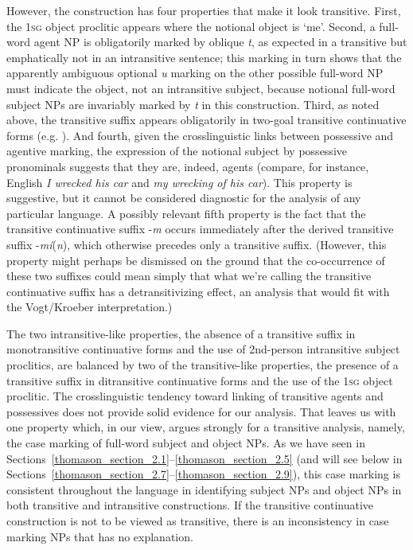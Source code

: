 \documentclass[output=paper,colorlinks,citecolor=brown]{langscibook}
\begin{document}
However, the construction has four properties that make it look
transitive.  First, the \textsc{1sg} object proclitic appears where the
notional object is `me'.  Second, a full-word agent NP is obligatorily
marked by oblique \emph{t}, as expected in a transitive but
emphatically not in an intransitive sentence; this marking in turn
shows that the apparently ambiguous optional \emph{{\textltilde}u}
marking on the other possible full-word NP must indicate the object,
not an intransitive subject, because notional full-word subject NPs
are invariably marked by \emph{t} in this construction.  Third, as
noted above, the transitive suffix appears obligatorily in two-goal
transitive continuative forms (e.g. ).  And fourth, given the
crosslinguistic links between possessive and agentive marking, the
expression of the notional subject by possessive pronominals suggests
that they are, indeed, agents (compare, for instance, English \emph{I
wrecked his car} and \emph{my wrecking of his car}).  This property is
suggestive, but it cannot be considered diagnostic for the analysis of
any particular language.  A possibly relevant fifth property is the
fact that the transitive continuative suffix -\emph{m} occurs
immediately after the derived transitive suffix
-\emph{m\'i}(\emph{n}), which otherwise precedes only a transitive
suffix.  (However, this property might perhaps be dismissed on the
ground that the co-occurrence of these two suffixes could mean simply
that what we're calling the transitive continuative suffix has a
detransitivizing effect, an analysis that would fit with the
Vogt/Kroeber interpretation.)


The two intransitive-like properties, the absence of a transitive
suffix in monotransitive continuative forms and the use of 2nd-person
intransitive subject proclitics, are balanced by two of the
transitive-like properties, the presence of a transitive suffix in
ditransitive continuative forms and the use of the \textsc{1sg} object
proclitic.  The crosslinguistic tendency toward linking of transitive
agents and possessives does not provide solid evidence for our
analysis.  That leaves us with one property which, in our view, argues
strongly for a transitive analysis, namely, the case marking of
full-word subject and object NPs.  As we have seen in 
Sections~\ref{thomason_section_2.1}--\ref{thomason_section_2.5} (and
will see below in 
Sections~\ref{thomason_section_2.7}--\ref{thomason_section_2.9}), 
this case marking is consistent
throughout the language in identifying subject NPs and object NPs in
both transitive and intransitive constructions.  If the transitive
continuative construction is not to be viewed as transitive, there is
an inconsistency in case marking NPs that has no explanation.
\end{document}
